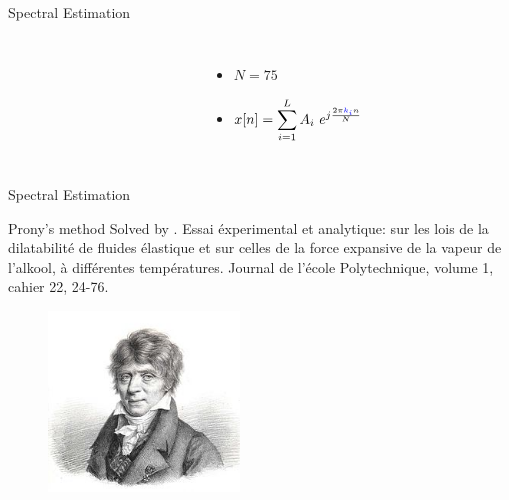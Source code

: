 \documentclass[10pt,xcolor=table]{beamer}
\begin{document}
\begin{frame}{Spectral Estimation}
	
	\begin{columns}
		
		\begin{figure}
			\centering
			\scalebox{0.60}{}
		\end{figure}
		
		\begin{figure}
			\centering
			\scalebox{0.60}{}
		\end{figure}

        \begin{itemize}
        \item $N=75$
        \item $x[n] = \displaystyle{\sum_{i=1}^L A_i \ e^{j \frac{2 \pi {\color{blue}{k_i}} n}{N}}}$
		\end{itemize}
	\end{columns}	
\end{frame}
\begin{frame}{Spectral Estimation}
\begin{block}{Prony's method}
Solved by {\color{blue}{Baron Gaspard Riche de Prony (1795)}}. Essai éxperimental et analytique: sur les lois de la dilatabilité de fluides élastique et sur celles de la force expansive de la vapeur de l'alkool, à différentes températures. Journal de l'école Polytechnique, volume 1, cahier 22, 24-76.
\end{block}
\begin{figure}
  \centering
  \includegraphics[width=2.0in]{Gaspard_de_Prony}
\end{figure}
\end{frame}
\end{document}
